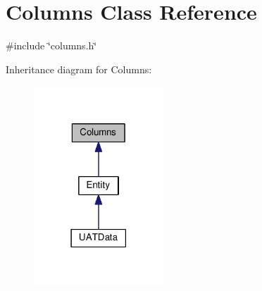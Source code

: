 \hypertarget{classColumns}{}\section{Columns Class Reference}
\label{classColumns}


{\ttfamily \#include \char`\"{}columns.\+h\char`\"{}}



Inheritance diagram for Columns\+:\nopagebreak
\begin{figure}[H]
\begin{center}
\leavevmode
\includegraphics[width=138pt]{classColumns__inherit__graph}
\end{center}
\end{figure}
